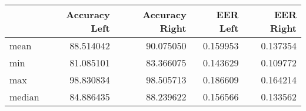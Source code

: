 \begin{tabular}{lrrrr}
\toprule
{} &  Accuracy Left &  Accuracy Right &  EER Left &  EER Right \\
\midrule
mean   &      88.514042 &       90.075050 &  0.159953 &   0.137354 \\
min    &      81.085101 &       83.366075 &  0.143629 &   0.109772 \\
max    &      98.830834 &       98.505713 &  0.186609 &   0.164214 \\
median &      84.886435 &       88.239622 &  0.156566 &   0.133562 \\
\bottomrule
\end{tabular}
